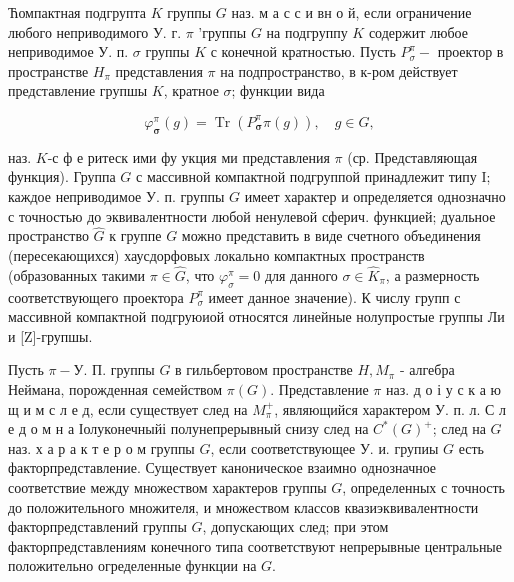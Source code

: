 \documentclass[10pt]{article}
\begin{document}
Ћомпактная подгрупта $K$ группы $G$ наз. м а с с и вн о й, если ограничение любого неприводимого У. г. $\pi$ 'группы $G$ на подгруппу $K$ содержит любое неприводимое У. п. $\sigma$ группы $K$ с конечной кратностью. Пусть $P_{\sigma}^{\pi}-$ проектор в пространстве $H_{\pi}$ представления $\pi$ на подпространство, в к-ром действует представление групшы $K$, кратное $\sigma$; функции вида



\[

\varphi_{\boldsymbol{\sigma}}^{\pi}(g)=\operatorname{Tr}\left(P_{\boldsymbol{\sigma}}^{\pi} \pi(g)\right), \quad g \in G,

\]



наз. $K$-с ф е ритеск ими фу укция ми представления $\pi$ (ср. Представляющая функция). Группа $G$ с массивной компактной подгруппой принадлежит типу I; каждое неприводимое У. п. группы $G$ имеет характер и определяется однозначно с точностью до эквивалентности любой ненулевой сферич. функцией; дуальное пространство $\hat{G}$ к группе $G$ можно представить в виде счетного объединения (пересекающихся) хаусдорфовых локально компактных пространств (образованных такими $\pi \in \widehat{G}$, что $\varphi_{\sigma}^{\pi}=0$ для данного $\sigma \in \hat{K}_{\pi}$, а размерность соответствующего проектора $P_{\sigma}^{\pi}$ имеет данное значение). К числу групп с массивной компактной подгруюиой относятся линейные нолупростые группы Ли и [Z]-групшы.



Пусть $\pi-У$. П. группы $G$ в гильбертовом пространстве $H, M_{\pi}$ - алгебра Неймана, порожденная семейством $\pi(G)$. Представление $\pi$ наз. д о і у с к а ю щ и м с л е д, если существует след на $M_{\pi}^{+}$, являющийся характером У. п. л. С л е д о м н а Іолуконечныйі полунепрерывный снизу след на $C^{*}(G)^{+}$; след на $G$ наз. х а р а к т е р о м группы $G$, если соответствующее У. и. групиы $G$ есть факторпредставление. Существует каноническое взаимно однозначное соответствие между множеством характеров группы $G$, определенных с точность до положительного множителя, и множеством классов квазиэквивалентности факторпредставлений группы $G$, допускающих след; при этом факторпредставлениям конечного типа соответствуют непрерывные центральные положительно огределенные функции на $G$.
\end{document}
